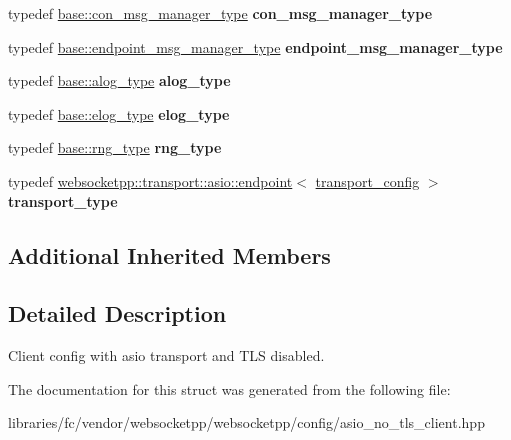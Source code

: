 \begin{DoxyCompactItemize}
typedef \mbox{\hyperlink{classwebsocketpp_1_1message__buffer_1_1alloc_1_1con__msg__manager}{base\+::con\+\_\+msg\+\_\+manager\+\_\+type}} {\bfseries con\+\_\+msg\+\_\+manager\+\_\+type}
\item 
\mbox{\label{structwebsocketpp_1_1config_1_1asio__client_aaeb34609830b9038bff2bbe3fec9d420}} 
typedef \mbox{\hyperlink{classwebsocketpp_1_1message__buffer_1_1alloc_1_1endpoint__msg__manager}{base\+::endpoint\+\_\+msg\+\_\+manager\+\_\+type}} {\bfseries endpoint\+\_\+msg\+\_\+manager\+\_\+type}
\item 
\mbox{\label{structwebsocketpp_1_1config_1_1asio__client_af6deeb2d0492bb8680b4e030fd201185}} 
typedef \mbox{\hyperlink{classwebsocketpp_1_1log_1_1basic}{base\+::alog\+\_\+type}} {\bfseries alog\+\_\+type}
\item 
\mbox{\label{structwebsocketpp_1_1config_1_1asio__client_abbef282de8c085b57d8f6780f0187a1d}} 
typedef \mbox{\hyperlink{structwebsocketpp_1_1config_1_1core__client_a24f1bae9e8a92bf7950153ed39eaffb8}{base\+::elog\+\_\+type}} {\bfseries elog\+\_\+type}
\item 
\mbox{\label{structwebsocketpp_1_1config_1_1asio__client_a02b4c4dd005aa41d70a70a60e3929d37}} 
typedef \mbox{\hyperlink{structwebsocketpp_1_1config_1_1core__client_adacb3a0ec249a2dea11871f299cf660f}{base\+::rng\+\_\+type}} {\bfseries rng\+\_\+type}
\item 
\mbox{\label{structwebsocketpp_1_1config_1_1asio__client_a0995b7dc42e350f8caa99b409b2cb0a7}} 
typedef \mbox{\hyperlink{classwebsocketpp_1_1transport_1_1asio_1_1endpoint}{websocketpp\+::transport\+::asio\+::endpoint}}$<$ \mbox{\hyperlink{structwebsocketpp_1_1config_1_1asio__client_1_1transport__config}{transport\+\_\+config}} $>$ {\bfseries transport\+\_\+type}
\end{DoxyCompactItemize}
\subsection*{Additional Inherited Members}


\subsection{Detailed Description}
Client config with asio transport and T\+LS disabled. 

The documentation for this struct was generated from the following file\+:\begin{DoxyCompactItemize}
\item 
libraries/fc/vendor/websocketpp/websocketpp/config/asio\+\_\+no\+\_\+tls\+\_\+client.\+hpp\end{DoxyCompactItemize}
